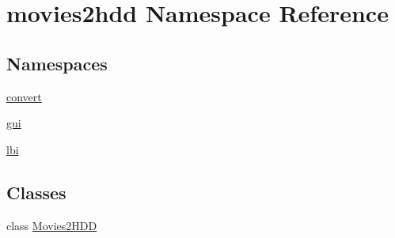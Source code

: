 \hypertarget{namespacemovies2hdd}{\section{movies2hdd Namespace Reference}
\label{namespacemovies2hdd}
}
\subsection*{Namespaces}
\begin{DoxyCompactItemize}
\item 
\hyperlink{namespacemovies2hdd_1_1convert}{convert}
\item 
\hyperlink{namespacemovies2hdd_1_1gui}{gui}
\item 
\hyperlink{namespacemovies2hdd_1_1lbi}{lbi}
\end{DoxyCompactItemize}
\subsection*{Classes}
\begin{DoxyCompactItemize}
\item 
class \hyperlink{classmovies2hdd_1_1_movies2_h_d_d}{Movies2\-H\-D\-D}
\end{DoxyCompactItemize}
